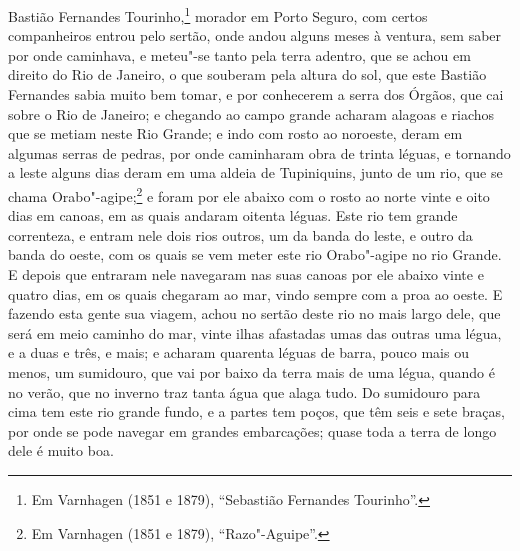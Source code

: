 \begin{linenumbers}
Bastião Fernandes Tourinho,\footnote{ Em Varnhagen (1851 e 1879), ``Sebastião Fernandes
Tourinho''.} morador em Porto Seguro, com certos companheiros entrou pelo sertão, onde
andou alguns meses à ventura, sem saber por onde caminhava, e meteu"-se tanto pela terra
adentro, que se achou em direito do Rio de Janeiro, o que souberam pela altura do sol, que
este Bastião Fernandes sabia muito bem tomar, e por conhecerem a serra dos Órgãos, que cai
sobre o Rio de Janeiro; e chegando ao campo grande acharam alagoas e riachos que se metiam
neste Rio Grande; e indo com rosto ao noroeste, deram em algumas serras de pedras, por
onde caminharam obra de trinta léguas, e tornando a leste alguns dias deram em uma aldeia
de Tupiniquins, junto de um rio, que se chama Orabo"-agipe;\footnote{ Em Varnhagen (1851 e
1879), ``Razo"-Aguipe''.} e foram por ele abaixo com o rosto ao norte vinte e oito dias em
canoas, em as quais andaram oitenta léguas. Este rio tem grande correnteza, e entram nele
dois rios outros, um da banda do leste, e outro da banda do oeste, com os quais se vem
meter este rio Orabo"-agipe no rio Grande. E depois que entraram nele navegaram nas suas
canoas por ele abaixo vinte e quatro dias, em os quais chegaram ao mar, vindo sempre com a
proa ao oeste. E fazendo esta gente sua viagem, achou no sertão deste rio no mais largo
dele, que será em meio caminho do mar, vinte ilhas afastadas umas das outras uma légua, e
a duas e três, e mais; e acharam quarenta léguas de barra, pouco mais ou menos, um
sumidouro, que vai por baixo da terra mais de uma légua, quando é no verão, que no inverno
traz tanta água que alaga tudo. Do sumidouro para cima tem este rio grande fundo, e a
partes tem poços, que têm seis e sete braças, por onde se pode navegar em grandes
embarcações; quase toda a terra de longo dele é muito boa.


\end{linenumbers}
